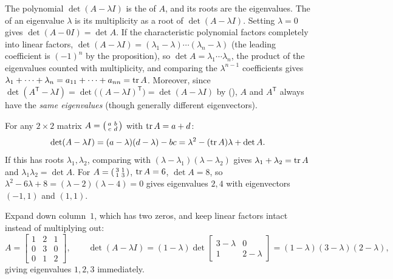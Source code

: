 \documentclass[10pt]{scrartcl}
\begin{document}
The polynomial $\det(A-\lambda I)$ is the  of $A$, and its roots are the eigenvalues. The  of an eigenvalue $\lambda$ is its multiplicity as a root of $\det(A-\lambda I)$. Setting $\lambda=0$ gives $\det(A-0I)=\det A$. If the characteristic polynomial factors completely into linear factors, $\det(A-\lambda I)=(\lambda_1-\lambda)\cdots(\lambda_n-\lambda)$ (the leading coefficient is $(-1)^n$ by the proposition), so $\det A=\lambda_1\cdots\lambda_n$, the product of the eigenvalues counted with multiplicity, and comparing the $\lambda^{n-1}$ coefficients gives $\lambda_1+\dots+\lambda_n=a_{11}+\dots+a_{nn}=\operatorname{tr} A$. Moreover, since $\det(A^{\mathsf T}-\lambda I)=\det\bigl((A-\lambda I)^{\mathsf T}\bigr)=\det(A-\lambda I)$ by (), $A$ and $A^{\mathsf T}$ always have the \emph{same eigenvalues} (though generally different eigenvectors).

 For any $2\times 2$ matrix $A=\begin{psmallmatrix}a&b\\c&d\end{psmallmatrix}$ with $\operatorname{tr} A=a+d$:
\[
  \det(A-\lambda I) = (a-\lambda)(d-\lambda)-bc = \lambda^2-(\operatorname{tr} A)\lambda+\det A.
\]
If this has roots $\lambda_1,\lambda_2$, comparing with $(\lambda-\lambda_1)(\lambda-\lambda_2)$ gives $\lambda_1+\lambda_2=\operatorname{tr} A$ and $\lambda_1\lambda_2=\det A$. For $A=\begin{psmallmatrix}3&1\\1&3\end{psmallmatrix}$, $\operatorname{tr} A=6$, $\det A=8$, so $\lambda^2-6\lambda+8=(\lambda-2)(\lambda-4)=0$ gives eigenvalues $2,4$ with eigenvectors $(-1,1)$ and $(1,1)$.

\begin{example*}
  Expand down column~$1$, which has two zeros, and keep linear factors intact instead of multiplying out:
  \[
    A=\begin{bmatrix}1&2&1\\0&3&0\\0&1&2\end{bmatrix}, \qquad
    \det(A-\lambda I) = (1-\lambda)\det\begin{bmatrix}3-\lambda&0\\1&2-\lambda\end{bmatrix} = (1-\lambda)(3-\lambda)(2-\lambda),
  \]
  giving eigenvalues $1,2,3$ immediately.
\end{example*}
\end{document}
